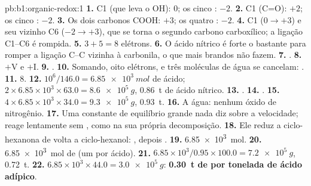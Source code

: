 \begin{solution}{pb:b1:organic-redox:1}
\textbf{1.} C1 (que leva o OH): 0; os cinco : $-2$.
\textbf{2.} C1 (C=O): $+2$; os cinco : $-2$.
\textbf{3.} Os dois carbonos COOH: $+3$; os quatro : $-2$.
\textbf{4.} C1 ($0 \to +3$) e seu vizinho C6 ($-2 \to +3$), que se torna
o segundo carbono carboxílico; a ligação C1--C6 é rompida.
\textbf{5.} $3 + 5 = 8$ elétrons.
\textbf{6.} O ácido nítrico é forte o bastante para romper a ligação C--C
vizinha à carbonila, o que  mais brandos não fazem.
\textbf{7.} .
\textbf{8.} $+$V e $+$I.
\textbf{9.} .
\textbf{10.} Somando, oito elétrons,  e três moléculas de água se
cancelam: .
\textbf{11.} 8.
\textbf{12.} $10^6/146.0 = \qty{6.85e3}{mol}$ de ácido; $2 \times 6.85 \times
10^3 \times 63.0 = \qty{8.6e5}{g}$, \qty{0.86}{t} de ácido nítrico.
\textbf{13.} .
\textbf{14.} .
\textbf{15.} $4 \times 6.85 \times 10^3 \times 34.0 = \qty{9.3e5}{g}$,
\qty{0.93}{t}.
\textbf{16.} A água: nenhum óxido de nitrogênio.
\textbf{17.} Uma constante de equilíbrio grande nada diz sobre a
velocidade;  reage lentamente sem , como na sua
própria decomposição.
\textbf{18.} Ele reduz a ciclo-hexanona de volta a ciclo-hexanol:
, depois
.
\textbf{19.} \qty{6.85e3}{mol}.
\textbf{20.} \qty{6.85e3}{mol} de  (um por ácido).
\textbf{21.} $6.85 \times 10^3/0.95 \times 100.0 = \qty{7.2e5}{g}$, \qty{0.72}{t}.
\textbf{22.} $6.85 \times 10^3 \times 44.0 = \qty{3.0e5}{g}$: \textbf{\qty{0.30}{t}
de  por tonelada de ácido adípico}.
\end{solution}
